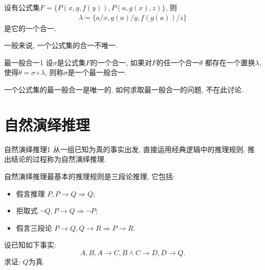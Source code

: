 \begin{example}
设有公式集$F=\{P(x,y,f(y)), P(a,g(x),z)\}$, 则
\begin{align}
  \lambda =\{a/x, g(a)/y, f(g(a))/z\}
\end{align}
是它的一个合一.
\end{example}

\begin{remark}
  一般来说, 一个公式集的合一不唯一.
\end{remark}

\begin{mydef}{最一般合一}{1}
设$\sigma$是公式集$F$的一个合一, 如果对$F$的任一个合一$\theta$ 都存在一个置换$\lambda$, 使得$\theta =\sigma \circ \lambda$, 则称$\sigma$是一个最一般合一.
\end{mydef}

\begin{remark}
  一个公式集的最一般合一是唯一的. 如何求取最一般合一的问题, 不在此讨论.
\end{remark}

\section{自然演绎推理}
\begin{mydef}{自然演绎推理}{1}
    从一组已知为真的事实出发, 直接运用经典逻辑中的推理规则, 推出结论的过程称为自然演绎推理.
\end{mydef}

自然演绎推理最基本的推理规则是三段论推理, 它包括:
\begin{itemize}
    \item 假言推理         $P,  P\rightarrow Q \Rightarrow  Q$;
    \item 拒取式            $\neg Q,  P\rightarrow Q \Rightarrow \neg P$;
    \item 假言三段论     $P\rightarrow Q,  Q\rightarrow R \Rightarrow  P\rightarrow R$.
\end{itemize}

\begin{example}\label{C3examp0355}
设已知如下事实:
          $$A,  B,  A\rightarrow C,  B\wedge C\rightarrow D,  D\rightarrow Q.$$
求证: $Q$为真.
\end{example}

